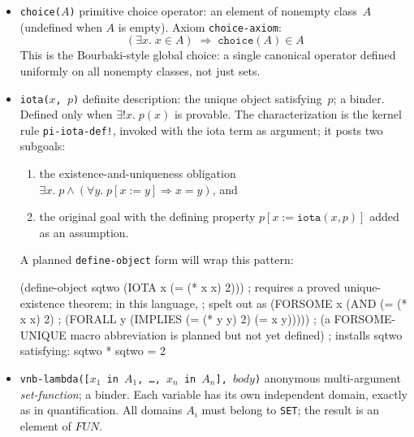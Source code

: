\begin{itemize}
\begin{itemize}
  \end{itemize}
  The notation $\{a,b,c,\ldots\}$ is sugar for $\texttt{make-set}([a,b,c,\ldots])$;
  repetitions are harmless.
\item \texttt{choice($A$)} primitive choice operator: an element of nonempty class~$A$
  (undefined when $A$ is empty).  Axiom \texttt{choice-axiom}:
  \[
    (\exists x.\; x \in A) \;\Longrightarrow\; \texttt{choice}(A) \in A
  \]
  This is the Bourbaki-style global choice: a single canonical operator
  defined uniformly on all nonempty classes, not just sets.
\item \texttt{iota($x$, $p$)} definite description: the unique object satisfying~$p$;
  a binder.  Defined only when $\exists! x.\; p(x)$ is provable.  The
  characterization is the kernel rule \texttt{pi-iota-def!}, invoked
  with the iota term as argument; it posts two subgoals:
  \begin{enumerate}[label=(\arabic*),leftmargin=1.2cm]
  \item the existence-and-uniqueness obligation
    $\exists x.\;p \land (\forall y.\; p[x:=y] \Rightarrow x = y)$, and
  \item the original goal with the defining property
    $p[x := \texttt{iota}(x, p)]$ added as an assumption.
  \end{enumerate}
  A planned \texttt{define-object} form will wrap this pattern:
\begin{VNBsnip}
(define-object sqtwo (IOTA x (= (* x x) 2)))
; requires a proved unique-existence theorem; in this language,
; spelt out as (FORSOME x (AND (= (* x x) 2)
;                              (FORALL y (IMPLIES (= (* y y) 2) (= x y)))))
; (a FORSOME-UNIQUE macro abbreviation is planned but not yet defined)
; installs sqtwo satisfying: sqtwo * sqtwo = 2
\end{VNBsnip}
\item \texttt{vnb-lambda([$x_1$ in $A_1$, \ldots, $x_n$ in $A_n$], $\mathit{body}$)}
  anonymous multi-argument \emph{set-function}; a binder.
  Each variable has its own independent domain, exactly as in quantification.
  All domains $A_i$ must belong to \texttt{SET}; the result is an element
  of $\mathit{FUN}$.


\end{itemize}
